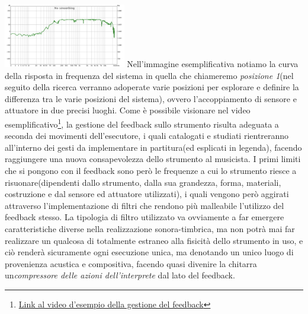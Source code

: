\documentclass[oneside]{article}
\begin{document}
\begin{multicols*}{2}
\includegraphics[width=0.4\textwidth]{img/ir.png}
\noindent
Nell'immagine esemplificativa notiamo la curva della risposta in frequenza del sistema in quella che chiameremo \textit{posizione 1}(nel seguito della ricerca verranno adoperate varie posizioni per esplorare e definire la differenza tra le varie posizioni del sistema), ovvero l'accoppiamento di sensore e attuatore in due precisi luoghi. Come è possibile visionare nel video esemplificativo\footnote{\href{https://www.youtube.com/watch?v=7BwwTopM3Ek}{Link al video d'esempio della gestione del feedback}}, la gestione del feedback sullo strumento risulta adeguata a seconda dei movimenti dell'esecutore, i quali catalogati e studiati rientreranno all'interno dei gesti da implementare in partitura(ed esplicati in legenda), facendo raggiungere una nuova consapevolezza dello strumento al musicista. I primi limiti che si pongono con il feedback sono però le frequenze a cui lo strumento riesce a risuonare(dipendenti dallo strumento, dalla sua grandezza, forma, materiali, costruzione e dal sensore ed attuatore utilizzati), i quali vengono però aggirati attraverso l'implementazione di filtri che rendono più malleabile l'utilizzo del feedback stesso. La tipologia di filtro utilizzato va ovviamente a far emergere caratteristiche diverse nella realizzazione sonora-timbrica, ma non potrà mai far realizzare un qualcosa di totalmente estraneo alla fisicità dello strumento in uso, e ciò renderà sicuramente ogni esecuzione unica, ma denotando un unico luogo di provenienza acustica e compositiva, facendo quasi divenire la chitarra un\textit{compressore delle azioni dell'interprete} dal lato del feedback.


\end{multicols*}
\end{document}
